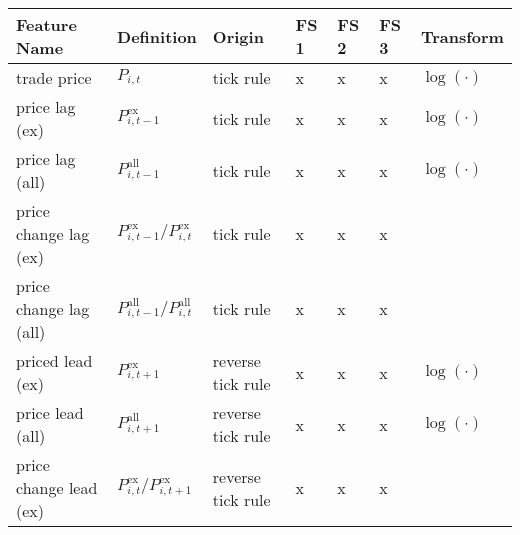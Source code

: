 \begin{threeparttable}
    \begin{tabular}{@{}lllllll@{}}
        \toprule
        Feature Name              & Definition                                                                                                                           & Origin               & FS 1 & FS 2 & FS 3 & Transform     \\ \midrule
        trade price               & $P_{i, t}$                                                                                                                           & tick rule            & x    & x    & x    & $\log(\cdot)$ \\
        price lag (ex)            & $P_{i, t-1}^{\text{ex}}$\tnote{*}                                                                                                    & tick rule            & x    & x    & x    & $\log(\cdot)$ \\
        price lag (all)           & $P_{i, t-1}^{\text{all}}$\tnote{*}                                                                                                   & tick rule            & x    & x    & x    & $\log(\cdot)$ \\
        price change lag (ex)     & $P_{i, t-1}^{\text{ex}}/P_{i, t}^{\text{ex}}$\tnote{*}                                                                               & tick rule            & x    & x    & x    &               \\
        price change lag (all)    & $P_{i, t-1}^{\text{all}}/P_{i, t}^{\text{all}}$\tnote{*}                                                                             & tick rule            & x    & x    & x    &               \\
        priced lead (ex)          & $P_{i, t+1}^{\text{ex}}$\tnote{*}                                                                                                    & reverse tick rule    & x    & x    & x    & $\log(\cdot)$ \\
        price lead (all)          & $P_{i, t+1}^{\text{all}}$\tnote{*}                                                                                                   & reverse tick rule    & x    & x    & x    & $\log(\cdot)$ \\
        price change lead (ex)    & $P_{i, t}^{\text{ex}}/P_{i, t+1}^{\text{ex}}$\tnote{*}                                                                               & reverse tick rule    & x    & x    & x    &               \\

\end{tabular}
\end{threeparttable}

